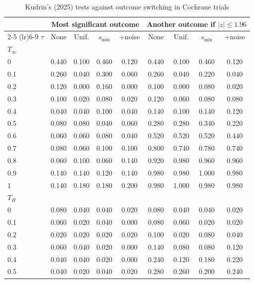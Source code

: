 \begin{table}[htbp]
\centering
\caption{Kudrin's (2025) tests against outcome switching in Cochrane trials}
\label{tab:cochrane_switching_power_kudrin}
\footnotesize
\setlength{\tabcolsep}{4pt}
\begin{tabular}{lcccccccc}
\toprule
 & \multicolumn{4}{c}{Most significant outcome} & \multicolumn{4}{c}{Another outcome if $|z| \le 1.96$} \\
\cmidrule(lr){2-5} \cmidrule(lr){6-9}
$\tau$ & None & Unif. & $s_{\min}$ & $+$noise & None & Unif. & $s_{\min}$ & $+$noise \\
\midrule
\multicolumn{9}{l}{\textit{$T_\infty$}} \\
0 & 0.440 & 0.100 & 0.460 & 0.120 & 0.440 & 0.100 & 0.460 & 0.120 \\
0.1 & 0.260 & 0.040 & 0.300 & 0.060 & 0.260 & 0.040 & 0.220 & 0.040 \\
0.2 & 0.120 & 0.000 & 0.160 & 0.000 & 0.100 & 0.000 & 0.080 & 0.020 \\
0.3 & 0.100 & 0.020 & 0.080 & 0.020 & 0.120 & 0.060 & 0.080 & 0.080 \\
0.4 & 0.040 & 0.040 & 0.100 & 0.040 & 0.140 & 0.100 & 0.140 & 0.120 \\
0.5 & 0.080 & 0.080 & 0.040 & 0.060 & 0.280 & 0.280 & 0.340 & 0.220 \\
0.6 & 0.060 & 0.060 & 0.080 & 0.040 & 0.520 & 0.520 & 0.520 & 0.440 \\
0.7 & 0.080 & 0.060 & 0.100 & 0.100 & 0.800 & 0.740 & 0.780 & 0.740 \\
0.8 & 0.060 & 0.100 & 0.060 & 0.140 & 0.920 & 0.980 & 0.960 & 0.960 \\
0.9 & 0.140 & 0.140 & 0.120 & 0.140 & 0.980 & 0.980 & 1.000 & 0.980 \\
1 & 0.140 & 0.180 & 0.180 & 0.200 & 0.980 & 1.000 & 0.980 & 0.980 \\
\midrule
\multicolumn{9}{l}{\textit{$T_H$}} \\
0 & 0.080 & 0.040 & 0.040 & 0.020 & 0.080 & 0.040 & 0.040 & 0.020 \\
0.1 & 0.060 & 0.020 & 0.040 & 0.000 & 0.080 & 0.060 & 0.020 & 0.020 \\
0.2 & 0.020 & 0.020 & 0.020 & 0.020 & 0.100 & 0.020 & 0.080 & 0.040 \\
0.3 & 0.060 & 0.040 & 0.020 & 0.000 & 0.140 & 0.080 & 0.080 & 0.120 \\
0.4 & 0.040 & 0.040 & 0.020 & 0.000 & 0.240 & 0.120 & 0.180 & 0.220 \\
0.5 & 0.040 & 0.020 & 0.040 & 0.020 & 0.280 & 0.260 & 0.200 & 0.240 \\

\end{tabular}
\end{table}
